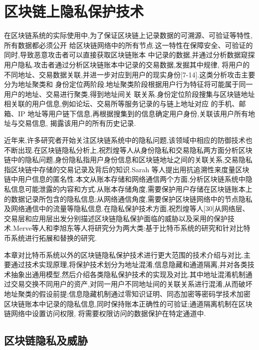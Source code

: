 
\chapter{区块链上隐私保护技术}
在区块链系统的实际使用中,为了保证区块链上记录数据的可溯源、可验证等特性,所有数据都必须公开 给区块链网络中的所有节点.这一特性在保障安全、可验证的同时,导致恶意攻击者可以直接获取区块链账本 中记录的数据,并通过分析数据窥探用户隐私.攻击者通过分析区块链账本中记录的交易数据,发掘其中规律,
将用户的不同地址、交易数据关联,并进一步对应到用户的现实身份[7-14].这类分析攻击主要分为地址聚类和 身份定位两阶段.地址聚类阶段根据用户行为特征将可能属于同一用户的地址、交易进行聚类,得到地址间关 联关系.身份定位阶段搜集与区块链地址相关联的用户信息,例如论坛、交易所等服务记录的与链上地址对应 的手机、邮箱、IP 地址等用户链下信息,再根据搜集到的信息确定用户身份,关联该用户所有地址与交易信息, 揭露该用户的所有历史记录.

近年来,许多研究者开始关注区块链系统中的隐私问题,该领域中相应的防御技术也不断出现.在区块链隐私分析上,祝烈煌等人从身份隐私和交易隐私两方面分析区块链中的隐私问题,身份隐私指用户身份信息和区块链地址之间的关联关系,交易隐私指区块链中存储的交易记录及背后的知识.Sarah 等人提出用抗追溯性来度量区块链中用户信息的匿名性.本文从账本存储和网络通信两个方面,分析区块链系统中隐私信息可能泄露的内容和方式.从账本存储角度,需要保护用户存储在区块链账本上的数据记录所包含的隐私信息;从网络通信角度,需要保护区块链网络中的节点隐私及网络通信中的流量等隐私信息.在隐私保护技术方面,祝烈煌等人[30]从网络层、交易层和应用层出发分别描述区块链隐私保护面临的威胁以及采用的保护技术.Merve等人和李旭东等人将研究分为两大类:基于比特币系统的研究和针对比特币系统进行拓展和替换的研究.

本章对比特币系统以外的区块链隐私保护技术进行更大范围的技术介绍与对比.主要通过技术实现原理,将保护技术划分为地址混淆,信息隐藏和通道隔离,并对各类技术抽象出通用模型,然后介绍各类隐私保护技术的实现及对比.其中地址混淆机制通过交易交换不同用户的资产,对同一用户不同地址间的关联关系进行混淆,从而破坏地址聚类的假设前提;信息隐藏机制通过零知识证明、同态加密等密码学技术加密区块链账本中记录的隐私信息,同时保持账本正确性的可验证;通道隔离机制在区块链网络中设置访问权限, 将需要权限访问的数据保护在特定通道中.

\section{区块链隐私及威胁}

